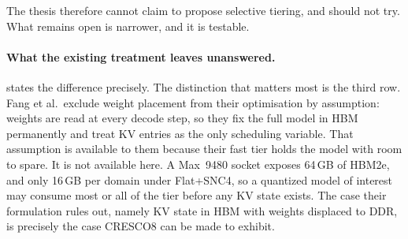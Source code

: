 The thesis therefore cannot claim to propose selective tiering, and
should not try.  What remains open is narrower, and it is testable.

\paragraph{What the existing treatment leaves unanswered.}
 states the difference precisely.  The
distinction that matters most is the third row.  Fang et al.\ exclude
weight placement from their optimisation by assumption: weights are read
at every decode step, so they fix the full model in HBM permanently and
treat KV entries as the only scheduling variable.  That assumption is
available to them because their fast tier holds the model with room to
spare.  It is not available here.  A Max~9480 socket exposes 64\,GB of
HBM2e, and only 16\,GB per domain under Flat+SNC4, so a quantized model
of interest may consume most or all of the tier before any KV state
exists.  The case their formulation rules out, namely KV state in HBM with
weights displaced to DDR, is precisely the case CRESCO8 can be made to
exhibit.

